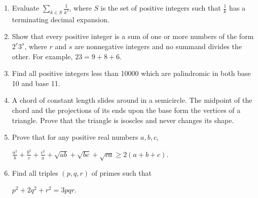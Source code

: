 \documentclass[12pt]{article}
\begin{document}
\begin{enumerate}[start = 1, itemsep=1.5em]
    \item Evaluate $\sum\limits_{k\in S}\frac{1}{k^3}$, where $S$ is the set of positive integers such that $\frac{1}{k}$ has a terminating decimal expansion.
    \item Show that every positive integer is a sum of one or more numbers of the form $2^r3^s$, where $r$ and $s$ are nonnegative integers and no summand divides the other. For example, $23 = 9+8+6$.  
    \item Find all positive integers less than 10000 which are palindromic in both base 10 and base 11.
    \item A chord of constant length slides around in a semicircle. The midpoint of the chord and the projections of its ends upon the base form the vertices of a triangle. Prove that the triangle is isoscles and never changes its shape.
    \item Prove that for any positive real numbers $a,b,c$,\begin{center}
        $\frac{a^2}{b}+\frac{b^2}{c}+\frac{c^2}{a}+\sqrt{ab}+\sqrt{bc}+\sqrt{ca}\geq 2(a+b+c)$.
    \end{center}
    \item Find all triples $(p,q,r)$ of primes such that \begin{center}
        $p^2 + 2q^2 + r^2=3pqr$.
    \end{center}
\end{enumerate}
\end{document}
